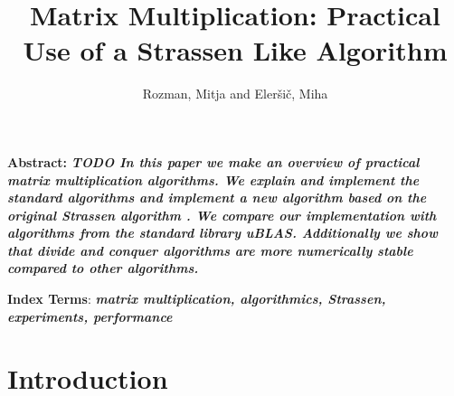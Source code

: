 \documentclass[a4paper,11pt]{article}
\title{Matrix Multiplication: Practical Use of a Strassen Like Algorithm}
\author{Rozman, Mitja and Eleršič, Miha}
\date{}
\renewenvironment{abstract}
{\begin{spacing}{1}\small\textbf{Abstract:}\bfseries\itshape}
{\end{spacing}}
\begin{document}
\maketitle



\begingroup
\renewcommand\thefootnote{}
\endgroup

\begin{abstract} %
TODO
In this paper we make an overview of practical matrix multiplication algorithms.
We explain and implement the standard algorithms and implement a new algorithm based on the original Strassen algorithm \cite{Strassen1969}.
We compare our implementation with algorithms from the standard library uBLAS. Additionally we show that divide and conquer algorithms are more numerically stable compared to other algorithms.
\end{abstract}
\vspace{0.5cm}
\begin{spacing}{0.9}
\small\textbf{Index Terms}:  \textbf{\textit {matrix multiplication, algorithmics, Strassen, experiments, performance}}
\end{spacing}


\section{Introduction}


\end{document}
